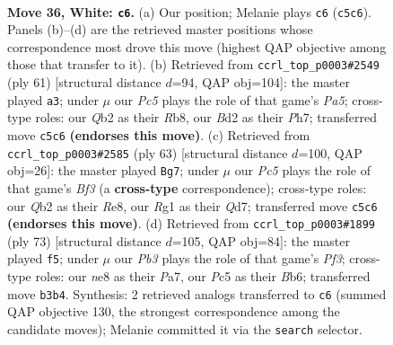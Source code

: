 \documentclass[11pt]{article}
\begin{document}
\clearpage

\begin{figure}[p]\centering
\begin{subfigure}{0.46\textwidth}\centering
\resizebox{\linewidth}{!}{%
\newchessgame
\chessboard[
  setfen={1r1rnk2/p1p5/5p2/2Pq4/3P1P1p/1P6/1Q1B1KRP/5BR1 w - - 3 36},
  showmover=false,
  pgfstyle=straightmove, color=movearrow, markmove={c5-c6}
]}
\caption{}
\end{subfigure}\hfill
\begin{subfigure}{0.46\textwidth}\centering
\resizebox{\linewidth}{!}{%
\newchessgame
\chessboard[
  setfen={1r2r2k/7p/1p1b1q2/1Q3p2/p2P2pP/2P3P1/2P2RNK/1R6 b - - 0 31},
  showmover=false,
  pgfstyle=straightmove, color=movearrow, markmove={a4-a3}
]}
\caption{}
\end{subfigure}
\\[4pt]
\begin{subfigure}{0.46\textwidth}\centering
\resizebox{\linewidth}{!}{%
\newchessgame
\chessboard[
  setfen={4r1k1/3q1p2/1p2rbp1/2p1p3/6QP/2PPRN2/1P3P2/4R1K1 b - - 0 32},
  showmover=false,
  pgfstyle=straightmove, color=movearrow, markmove={f6-g7}
]}
\caption{}
\end{subfigure}\hfill
\begin{subfigure}{0.46\textwidth}\centering
\resizebox{\linewidth}{!}{%
\newchessgame
\chessboard[
  setfen={1kq1r3/p1p5/1bQ2p2/4r1p1/R7/2R1N1Pp/1P5P/2B2K2 b - - 2 37},
  showmover=false,
  pgfstyle=straightmove, color=movearrow, markmove={f6-f5}
]}
\caption{}
\end{subfigure}
\caption{\textbf{Move 36, White: \texttt{c6}.} (a) Our position; Melanie plays \texttt{c6} (\texttt{c5c6}). Panels (b)--(d) are the retrieved master positions whose correspondence most drove this move (highest QAP objective among those that transfer to it). (b) Retrieved from \texttt{ccrl\_top\_p0003\#2549} (ply 61) [structural distance $d$=94, QAP obj=104]: the master played \texttt{a3}; under $\mu$ our \emph{Pc5} plays the role of that game's \emph{Pa5}; cross-type roles: our \emph{Q}b2 as their \emph{R}b8, our \emph{B}d2 as their \emph{P}h7; transferred move \texttt{c5c6} \textbf{(endorses this move)}. (c) Retrieved from \texttt{ccrl\_top\_p0003\#2585} (ply 63) [structural distance $d$=100, QAP obj=26]: the master played \texttt{Bg7}; under $\mu$ our \emph{Pc5} plays the role of that game's \emph{Bf3} (a \textbf{cross-type} correspondence); cross-type roles: our \emph{Q}b2 as their \emph{R}e8, our \emph{R}g1 as their \emph{Q}d7; transferred move \texttt{c5c6} \textbf{(endorses this move)}. (d) Retrieved from \texttt{ccrl\_top\_p0003\#1899} (ply 73) [structural distance $d$=105, QAP obj=84]: the master played \texttt{f5}; under $\mu$ our \emph{Pb3} plays the role of that game's \emph{Pf3}; cross-type roles: our \emph{n}e8 as their \emph{P}a7, our \emph{P}c5 as their \emph{B}b6; transferred move \texttt{b3b4}. Synthesis: 2 retrieved analogs transferred to \texttt{c6} (summed QAP objective 130, the strongest correspondence among the candidate moves); Melanie committed it via the \texttt{search} selector.}
\label{fig:thought-m70}
\end{figure}
\end{document}
